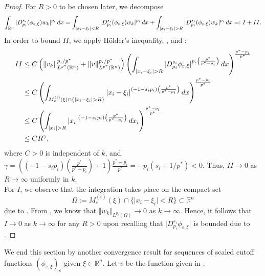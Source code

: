 \documentclass[11pt]{amsart}
\theoremstyle{plain}
\theoremstyle{definition}
\numberwithin{equation}{section}
\renewcommand{\d}{\textnormal{d}}
\newcommand{\R}{\mathbb{R}}
\newcommand{\eps}{\varepsilon}
\begin{document}
\begin{proof}
 For $R >0$ to be chosen later, we decompose
\begin{equation*}
\int_{\R^n} \vert D^{s_i}_{p_i}(\phi_{\eps,\xi})w_k \vert^{p_i} \, \d x = \int_{\vert x_i - \xi_i \vert < R} \vert D^{s_i}_{p_i}(\phi_{\eps,\xi})w_k \vert^{p_i} \, \d x + \int_{\vert x_i - \xi_i \vert > R} \vert D^{s_i}_{p_i}(\phi_{\eps,\xi})w_k \vert^{p_i} \, \d x =: I + II.
\end{equation*}
In order to bound $II$, we apply H\"older's inequality, , and :
\begin{equation*}
\begin{split}
II &\le C \left(\Vert v_k \Vert_{L^{p^{\ast}}(\R^n)}^{p_i/p^{\ast}} + \Vert v \Vert_{L^{p^{\ast}}(\R^n)}^{p_i/p^{\ast}} \right)\left( \int_{\vert x_i -\xi_i\vert > R} \vert D^{s_i}_{p_i}\phi_{\eps,\xi}\vert^{p_i\left(\frac{p^{\ast}}{p^{\ast} - p_i}\right)}\, \d x\right)^{\frac{p^{\ast}-p_i}{p^{\ast}}}\\
&\le C \left( \int_{M_{\eps}^{(i)}(\xi) \cap \{\vert x_i - \xi_i \vert > R\}} \vert x_i- \xi_i\vert^{(-1-s_ip_i)\left(\frac{p^{\ast}}{p^{\ast} - p_i}\right)} \, \d x\right)^{\frac{p^{\ast}-p_i}{p^{\ast}}}\\
&\le C\left(\int_{\vert x_i \vert > R} \vert x_i\vert^{(-1-s_ip_i)\left(\frac{p^{\ast}}{p^{\ast} - p_i}\right)} \, \d x_i\right)^{\frac{p^{\ast}-p_i}{p^{\ast}}}\\
&\le C R^{\gamma},
\end{split}
\end{equation*}
where $C >0$ is independent of $k$, and $\gamma = \left((-1-s_ip_i)\left(\frac{p^{\ast}}{p^{\ast} - p_i}\right)+1\right)\frac{p^{\ast}-p_i}{p^{\ast}} = -p_i(s_i+1/p^{\ast}) < 0$. Thus, $II \to 0$ as $R \to \infty$ uniformly in $k$.\\
For $I$, we observe that the integration takes place on the compact set 
\begin{equation*}
\Omega := M_{\eps}^{(i)}(\xi) \cap \{\vert x_i - \xi_i\vert < R \} \subset \R^n
\end{equation*}
due to . From , we know that $\Vert w_k \Vert_{L^{p_i}(\Omega)} \to 0$ as $k \to \infty$. Hence, it follows that $I \to 0$ as $k \to \infty$ for any $R > 0$ upon recalling that $\vert D^{s_i}_{p_i}\phi_{\eps,\xi}\vert$ is bounded due to .
\end{proof}

We end this section by another convergence result for sequences of scaled cutoff functions $(\phi_{\eps,\xi})_{\eps}$ given $\xi \in \R^n$. Let $v$ be the function given in .
\end{document}
